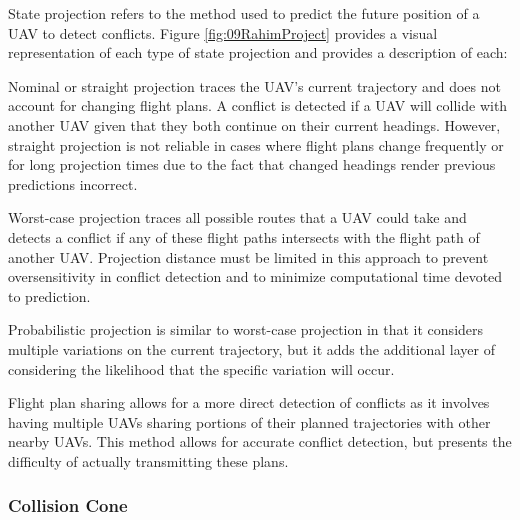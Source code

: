\documentclass[conference]{IEEEtran}
\begin{document}
State projection refers to the method used to predict the future position of a UAV to detect conflicts. Figure \ref{fig:09RahimProject} provides a visual representation of each type of state projection and \cite{albaker2009survey} provides a description of each:

Nominal or straight projection traces the UAV's current trajectory and does not account for changing flight plans.  A conflict is detected if a UAV will collide with another UAV given that they both continue on their current headings.  However, straight projection is not reliable in cases where flight plans change frequently or for long projection times due to the fact that changed headings render previous predictions incorrect.

Worst-case projection traces all possible routes that a UAV could take and detects a conflict if any of these flight paths intersects with the flight path of another UAV.  Projection distance must be limited in this approach to prevent oversensitivity in conflict detection and to minimize computational time devoted to prediction.

Probabilistic projection is similar to worst-case projection in that it considers multiple variations on the current trajectory, but it adds the additional layer of considering the likelihood that the specific variation will occur.  

Flight plan sharing allows for a more direct detection of conflicts as it involves having multiple UAVs sharing portions of their planned trajectories with other nearby UAVs.  This method allows for accurate conflict detection, but presents the difficulty of actually transmitting these plans.  

\subsubsection{Collision Cone}
\end{document}
